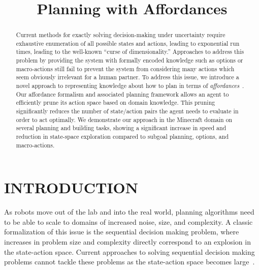 \documentclass[]{article}
\title{Planning with Affordances}
\begin{document}
\author{}
\maketitle

\begin{abstract}
Current methods for exactly solving decision-making under uncertainty
require exhaustive enumeration of all possible states and actions,
leading to exponential run times, leading to the well-known ``curse of
dimensionality.''  Approaches to address this problem by providing the
system with formally encoded knowledge such as options or
macro-actions still fail to prevent the system from considering many
actions which seem obviously irrelevant for a human partner.  To
address this issue, we introduce a novel approach to representing
knowledge about how to plan in terms of {\em
  affordances}~\citep{gibson77}.  Our affordance formalism and
associated planning framework allows an agent to efficiently prune its
action space based on domain knowledge.  This pruning significantly
reduces the number of state/action pairs the agent needs to evaluate
in order to act optimally.  We demonstrate our approach in the
Minecraft domain on several planning and building tasks, showing a
significant increase in speed and reduction in state-space exploration
compared to subgoal planning, options, and macro-actions.
\end{abstract}

\section{INTRODUCTION}

As robots move out of the lab and into the real world, planning
algorithms need to be able to scale to domains of increased noise,
size, and complexity.  A classic formalization of this issue is the
sequential decision making problem, where increases in problem size
and complexity directly correspond to an explosion in the state-action
space. Current approaches to solving sequential decision making
problems cannot tackle these problems as the state-action space
becomes large~\citep{Grounds2005}.
\end{document}
